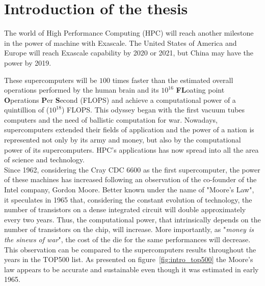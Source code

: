 \chapter*{Introduction of the thesis}

The world of High Performance Computing (HPC) will reach another milestone in the power of machine with Exascale. 
The United States of America and Europe will reach Exascale capability by 2020 or 2021, but China may have the power by 2019. 

These supercomputers will be $100$ times faster than the estimated overall operations performed by the human brain and its $10^{16}$ \textbf{FL}oating point \textbf{O}perations \textbf{P}er \textbf{S}econd (FLOPS) \cite{kurzweil2010singularity} and achieve a computational power of a quintillion of ($10^{18}$) FLOPS.
This odyssey began with the first vacuum tubes computers and the need of ballistic computation for war. 
Nowadays, supercomputers extended their fields of application and the power of a nation is represented not only by its army and money, but also by the computational power of its supercomputers.
HPC's applications has now spread into all the area of science and technology.\\

Since 1962, considering the Cray CDC 6600 as the first supercomputer, the power of these machines has increased following an observation of the co-founder of the Intel company, Gordon Moore. 
Better known under the name of "Moore's Law", it speculates in 1965 that, considering the constant evolution of technology, the number of transistors on a dense integrated circuit will double approximately every two years. 
Thus, the computational power, that intrinsically depends on the number of transistors on the chip, will increase.
More importantly, as "\textit{money is the sinews of war}", the cost of the die for the same performances will decrease.  
This observation can be compared to the supercomputers results throughout the years in the TOP500 list. 
As presented on figure~\ref{fig:intro_top500} the Moore's law appears to be accurate and sustainable even though it was estimated in early 1965. 

